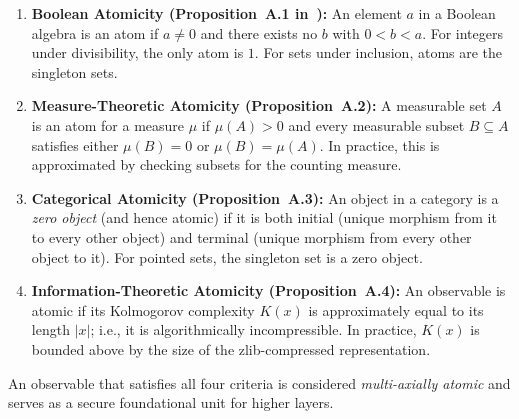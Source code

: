 \begin{enumerate}
    \item \textbf{Boolean Atomicity (Proposition~A.1 in~\cite{beniers2026apeiron}):} An element $a$ in a Boolean algebra is an atom if $a \neq 0$ and there exists no $b$ with $0 < b < a$. For integers under divisibility, the only atom is $1$. For sets under inclusion, atoms are the singleton sets.
    \item \textbf{Measure-Theoretic Atomicity (Proposition~A.2):} A measurable set $A$ is an atom for a measure $\mu$ if $\mu(A) > 0$ and every measurable subset $B \subseteq A$ satisfies either $\mu(B) = 0$ or $\mu(B) = \mu(A)$. In practice, this is approximated by checking subsets for the counting measure.
    \item \textbf{Categorical Atomicity (Proposition~A.3):} An object in a category is a \textit{zero object} (and hence atomic) if it is both initial (unique morphism from it to every other object) and terminal (unique morphism from every other object to it). For pointed sets, the singleton set is a zero object.
    \item \textbf{Information-Theoretic Atomicity (Proposition~A.4):} An observable is atomic if its Kolmogorov complexity $K(x)$ is approximately equal to its length $|x|$; i.e., it is algorithmically incompressible. In practice, $K(x)$ is bounded above by the size of the zlib-compressed representation.
\end{enumerate}

An observable that satisfies all four criteria is considered \textit{multi-axially atomic} and serves as a secure foundational unit for higher layers.